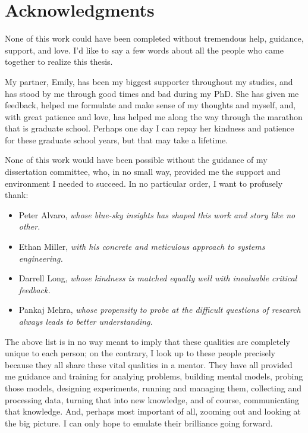 

\begingroup
\let\clearpage\relax
\let\cleardoublepage\relax
\let\cleardoublepage\relax
\chapter*{Acknowledgments}

None of this work could have been completed without tremendous help, guidance, support, and love. I'd like to say a few
words about all the people who came together to realize this thesis.

My partner, Emily, has been my biggest supporter throughout my studies, and has stood by me through good times and bad
during my PhD. She has given me feedback, helped me formulate and make sense of my thoughts and myself, and, with great
patience and love, has helped me along the way through the marathon that is graduate school. Perhaps one day I can repay
her kindness and patience for these graduate school years, but that may take a lifetime.

None of this work would have been possible without the guidance of my dissertation committee, who, in no small way,
provided me the support and environment I needed to succeed. In no particular order, I want to profusely thank:

\begin{itemize}
    \item Peter Alvaro, \emph{whose blue-sky insights has shaped this work and story like no other.}
    \item Ethan Miller, \emph{with his concrete and meticulous approach to systems engineering.}
    \item Darrell Long, \emph{whose kindness is matched equally well with invaluable critical feedback.}
    \item Pankaj Mehra, \emph{whose propensity to probe at the difficult questions of research always leads to better understanding.}
\end{itemize}

The above list is in no way meant to imply that these qualities are completely unique to each person; on the contrary,
I look up to these people precisely because they all share these vital qualities in a mentor. They have all provided me
guidance and training for analying problems, building mental models, probing those models, designing experiments,
running and managing them, collecting and processing data, turning that into new knowledge, and of course, communicating
that knowledge. And, perhaps most important of all, zooming out and looking at the big picture. I can only hope to
emulate their brilliance going forward.

